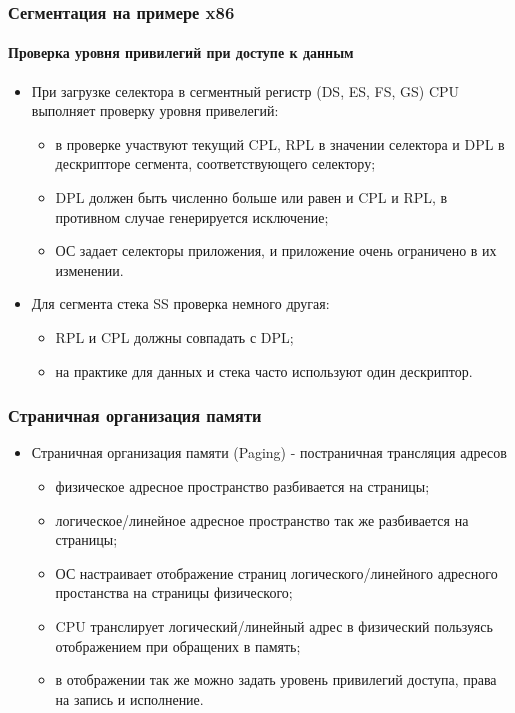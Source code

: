 \begin{frame}
\frametitle{Сегментация на примере x86}
\framesubtitle{Проверка уровня привилегий при доступе к данным}
\begin{itemize}
  \item При загрузке селектора в сегментный регистр (DS, ES, FS, GS) CPU
  выполняет проверку уровня привелегий:
  \begin{itemize}
    \item в проверке участвуют текущий CPL, RPL в значении селектора и DPL в
    дескрипторе сегмента, соответствующего селектору;
    \item DPL должен быть численно больше или равен и CPL и RPL, в противном
    случае генерируется исключение;
    \item ОС задает селекторы приложения, и приложение очень ограничено в их
    изменении.
  \end{itemize}
  \item Для сегмента стека SS проверка немного другая:
  \begin{itemize}
    \item RPL и CPL должны совпадать с DPL;
    \item на практике для данных и стека часто используют один дескриптор.
  \end{itemize}
\end{itemize}
\end{frame}

\begin{frame}
\frametitle{Страничная организация памяти}
\begin{itemize}
  \item Страничная организация памяти (Paging) - постраничная трансляция адресов
  \begin{itemize}
    \item физическое адресное пространство разбивается на страницы;
    \item логическое/линейное адресное пространство так же разбивается на
    страницы;
    \item ОС настраивает отображение страниц логического/линейного адресного
    простанства на страницы физического;
    \item CPU транслирует логический/линейный адрес в физический пользуясь
    отображением при обращених в память;
    \item в отображении так же можно задать уровень привилегий доступа, права
    на запись и исполнение.
  \end{itemize}
\end{itemize}
\end{frame}

